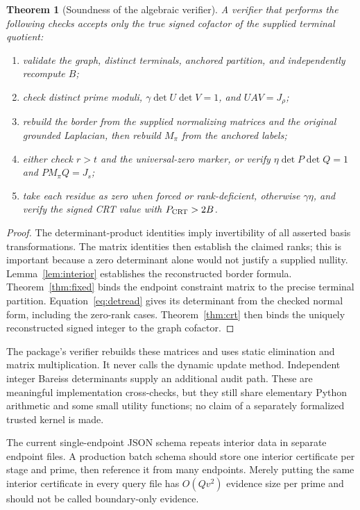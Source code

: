 \documentclass[11pt,letterpaper]{article}
\newtheorem{theorem}{Theorem}[section]
\theoremstyle{definition}\newtheorem{definition}[theorem]{Definition}
\theoremstyle{remark}\newtheorem{remark}[theorem]{Remark}
\begin{document}
\begin{theorem}[Soundness of the algebraic verifier]
\label{thm:verify}
A verifier that performs the following checks accepts only the true signed cofactor of the supplied terminal quotient:
\begin{enumerate}[label=(\roman*)]
\item validate the graph, distinct terminals, anchored partition, and independently recompute $B$;
\item check distinct prime moduli, $\gamma\det U\det V=1$, and $UAV=J_\rho$;
\item rebuild the border from the supplied normalizing matrices and the original grounded Laplacian, then rebuild $M_\pi$ from the anchored labels;
\item either check $r>t$ and the universal-zero marker, or verify $\eta\det P\det Q=1$ and $PM_\pi Q=J_s$;
\item take each residue as zero when forced or rank-deficient, otherwise $\gamma\eta$, and verify the signed CRT value with $P_{\rm CRT}>2B$.
\end{enumerate}
\end{theorem}
\begin{proof}
The determinant-product identities imply invertibility of all asserted basis transformations. The matrix identities then establish the claimed ranks; this is important because a zero determinant alone would not justify a supplied nullity. Lemma~\ref{lem:interior} establishes the reconstructed border formula. Theorem~\ref{thm:fixed} binds the endpoint constraint matrix to the precise terminal partition. Equation~\eqref{eq:detread} gives its determinant from the checked normal form, including the zero-rank cases. Theorem~\ref{thm:crt} then binds the uniquely reconstructed signed integer to the graph cofactor.
\end{proof}

The package's verifier rebuilds these matrices and uses static elimination and matrix multiplication. It never calls the dynamic update method. Independent integer Bareiss determinants supply an additional audit path. These are meaningful implementation cross-checks, but they still share elementary Python arithmetic and some small utility functions; no claim of a separately formalized trusted kernel is made.

The current single-endpoint JSON schema repeats interior data in separate endpoint files. A production batch schema should store one interior certificate per stage and prime, then reference it from many endpoints. Merely putting the same interior certificate in every query file has $O(Qv^2)$ evidence size per prime and should not be called boundary-only evidence.
\end{document}
